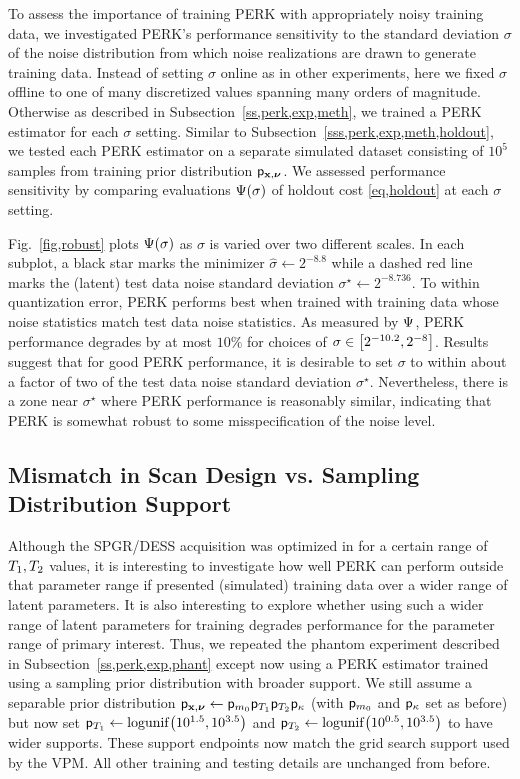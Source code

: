To assess the importance
of training PERK
with appropriately noisy training data,
we investigated PERK's performance sensitivity
to the standard deviation $\sigma$
of the noise distribution 
from which noise realizations are drawn
to generate training data.
Instead of setting $\sigma$ online
as in other experiments,
here we fixed $\sigma$ offline
to one of many discretized values
spanning many orders of magnitude.
Otherwise as described 
in Subsection~\ref{ss,perk,exp,meth},
we trained a PERK estimator
for each $\sigma$ setting.
Similar to Subsection~\ref{sss,perk,exp,meth,holdout},
we tested each PERK estimator 
on a separate simulated dataset
consisting of $10^5$ samples 
from training prior distribution $\mathsf{p}_{\mathbf{x},\boldsymbol{\nu}}$.
We assessed performance sensitivity
by comparing evaluations $\costa{\sigma}$ 
of holdout cost \eqref{eq,holdout}
at each $\sigma$ setting.
	
Fig.~\ref{fig,robust} plots $\costa{\sigma}$
as $\sigma$ is varied 
over two different scales.
In each subplot,
a black star marks the minimizer 
$\hat{\sigma} \gets 2^{-8.8}$
while a dashed red line marks
the (latent) test data noise standard deviation 
$\sigma^\star \gets 2^{-8.736}$.
To within quantization error,
PERK performs best 
when trained with training data
whose noise statistics 
match test data noise statistics.
As measured by $\Psi$, 
PERK performance degrades by at most $10\%$ 
for choices of $\sigma \in \brac{2^{-10.2},2^{-8}}$.
Results suggest
that for good PERK performance,
it is desirable
to set $\sigma$
to within about a factor of two
of the test data noise standard deviation $\sigma^\star$.
Nevertheless,
there is a zone near $\sigma^\star$
where PERK performance is reasonably similar,
indicating that PERK is somewhat robust
to some misspecification of the noise level.

\subsection{Mismatch in Scan Design vs. Sampling Distribution Support}
\label{ss,perk,robust,dist}

Although the SPGR/DESS acquisition
was optimized in \cite{nataraj:17:oms}
for a certain range of $T_1,T_2$ values,
it is interesting to investigate
how well PERK can perform 
outside that parameter range
if presented (simulated) training data
over a wider range of latent parameters.
It is also interesting to explore
whether using such a wider range 
of latent parameters for training
degrades performance
for the parameter range 
of primary interest.
Thus, 
we repeated the phantom experiment
described in Subsection~\ref{ss,perk,exp,phant}
except now using a PERK estimator
trained using a sampling prior distribution
with broader support.
We still assume a separable prior distribution
$\mathsf{p}_{\mathbf{x},\boldsymbol{\nu}} \gets \mathsf{p}_{m_0}\mathsf{p}_{T_1}\mathsf{p}_{T_2}\mathsf{p}_{\kappa}$ 
(with $\mathsf{p}_{m_0}$ and $\mathsf{p}_{\kappa}$ set as before)
but now set 
$\dist{\To} \gets \logunif{10^{1.5}, 10^{3.5}}$ 
and 
$\dist{\Tt} \gets \logunif{10^{0.5}, 10^{3.5}}$ 
to have wider supports.
These support endpoints 
now match the grid search support
used by the VPM.
All other training and testing details are unchanged from before.

